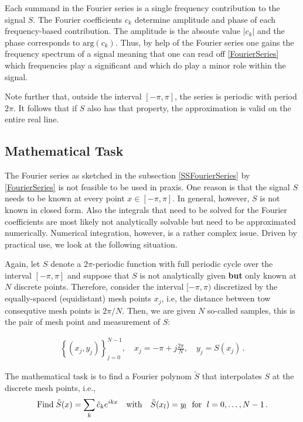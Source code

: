 \documentclass[a4paper, 10pt]{article}
\begin{document}
{Each summand in the Fourier series is a single frequency contribution to the signal $S$. The Fourier coefficients $c_k$ determine amplitude and phase of each frequency-based contribution. The amplitude is the absoute value $|c_k|$ and the phase corresponds to $\mathrm{arg}(c_k)$. Thus, by help of the Fourier series one gains the frequency spectrum of a signal meaning that one can read off \eqref{FourierSeries} which frequencies play a significant and which do play a minor role within the signal.

Note further that, outside the interval $[-\pi,\pi]$, the series is periodic with period $2\pi$. It follows that if $S$ also has that property, the approximation is valid on the entire real line.

\subsection{Mathematical Task} \label{Task}

The Fourier series as sketched in the subsection \ref{SSFourierSeries} by \eqref{FourierSeries} is not feasible to be used in praxis. One reason is that the signal $S$ needs to be known at every point $x\in [-\pi,\pi]$. In general, however, $S$ is not known in closed form. Also the integrals that need to be solved for the Fourier coefficients are most likely not analytically solvable but need to be approximated numerically. Numerical integration, however, is a rather complex issue. Driven by practical use, we look at the following situation.


Again, let $S$ denote a $2\pi$-periodic function with full periodic cycle over the interval $[-\pi,\pi]$ and suppose that $S$ is not analytically given {\bf but} only known at $N$ discrete points. Therefore, consider the interval $[-\pi,\pi)$ discretized by the equally-spaced (equidistant) mesh points $x_j$, i.e, the distance between tow consequtive mesh points is $2\pi/N$.   Then, we are given $N$ so-called samples, this is the pair of mesh point and measurement of $S$:

\begin{eqnarray*}
\left\{ \left(x_j, y_j\right) \right\}_{j=0}^{N-1}, \quad x_j=-\pi+j\frac{2\pi}{N}, \quad y_j = S(x_j) \,.
\end{eqnarray*}


The mathematical task is to find a Fourier polynom $\tilde S$ that interpolates $S$ at the discrete mesh points, i.e.,
\begin{equation}\label{MathematicalTask}
\textnormal{Find} \; \tilde S(x) = \sum\limits_{k} \tilde c_k e^{ikx} \quad \textnormal{with}\quad \tilde S(x_l) = y_l \; \textnormal{ for }\; l=0,\dots,N-1\,.
\end{equation}

}
\end{document}
